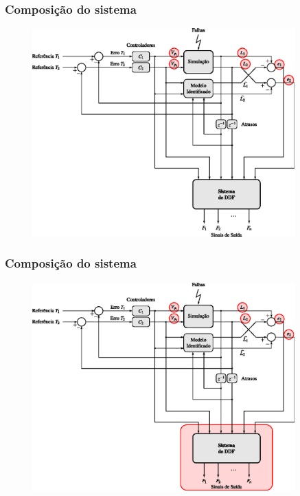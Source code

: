 \documentclass{beamer}
\begin{document}
\begin{frame}
    \frametitle{Composição do sistema}

\begin{figure}[htb]
\centering
    \includegraphics[width=0.9\textwidth]{imgs/sistema/eps/composicao_mod_7}
\end{figure}
\end{frame}

\begin{frame}
    \frametitle{Composição do sistema}

\begin{figure}[htb]
\centering
    \includegraphics[width=0.9\textwidth]{imgs/sistema/eps/composicao_mod_8}
\end{figure}
\end{frame}
\end{document}
